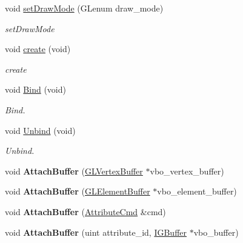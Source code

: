 \begin{DoxyCompactItemize}
\item 
void \hyperlink{classEngine_1_1GLVertexArrayObject_ad2c7e334c24e3cbbb8450561e64ed32c}{set\+Draw\+Mode} (G\+Lenum draw\+\_\+mode)
\begin{DoxyCompactList}\small\item\em set\+Draw\+Mode \end{DoxyCompactList}\item 
void \hyperlink{classEngine_1_1GLVertexArrayObject_a5cb83f3cca36e9250c2ecd7747ee14c9}{create} (void)
\begin{DoxyCompactList}\small\item\em create \end{DoxyCompactList}\item 
void \hyperlink{classEngine_1_1GLVertexArrayObject_aa2fbd8bf27ddde48e6d6deab0a169a5f}{Bind} (void)
\begin{DoxyCompactList}\small\item\em Bind. \end{DoxyCompactList}\item 
void \hyperlink{classEngine_1_1GLVertexArrayObject_a2a64f18e180118d8b51ac30f8c9f6bf7}{Unbind} (void)
\begin{DoxyCompactList}\small\item\em Unbind. \end{DoxyCompactList}\item 
\hypertarget{classEngine_1_1GLVertexArrayObject_ac609320f7a23fbe91ad2d992c393a0eb}{}void {\bfseries Attach\+Buffer} (\hyperlink{classEngine_1_1GLVertexBuffer}{G\+L\+Vertex\+Buffer} $\ast$vbo\+\_\+vertex\+\_\+buffer)\label{classEngine_1_1GLVertexArrayObject_ac609320f7a23fbe91ad2d992c393a0eb}

\item 
\hypertarget{classEngine_1_1GLVertexArrayObject_a5b0c6bdbb98ce4c810e42427dd563754}{}void {\bfseries Attach\+Buffer} (\hyperlink{classEngine_1_1GLElementBuffer}{G\+L\+Element\+Buffer} $\ast$vbo\+\_\+element\+\_\+buffer)\label{classEngine_1_1GLVertexArrayObject_a5b0c6bdbb98ce4c810e42427dd563754}

\item 
\hypertarget{classEngine_1_1GLVertexArrayObject_aca1ce0b37547b8bd8b1ef2c4b30386b6}{}void {\bfseries Attach\+Buffer} (\hyperlink{structEngine_1_1AttributeCmd}{Attribute\+Cmd} \&cmd)\label{classEngine_1_1GLVertexArrayObject_aca1ce0b37547b8bd8b1ef2c4b30386b6}

\item 
\hypertarget{classEngine_1_1GLVertexArrayObject_a6080bc3aff814fc36d90bb13743d871b}{}void {\bfseries Attach\+Buffer} (uint attribute\+\_\+id, \hyperlink{classEngine_1_1IGBuffer}{I\+G\+Buffer} $\ast$vbo\+\_\+buffer)\label{classEngine_1_1GLVertexArrayObject_a6080bc3aff814fc36d90bb13743d871b}


\end{DoxyCompactItemize}
